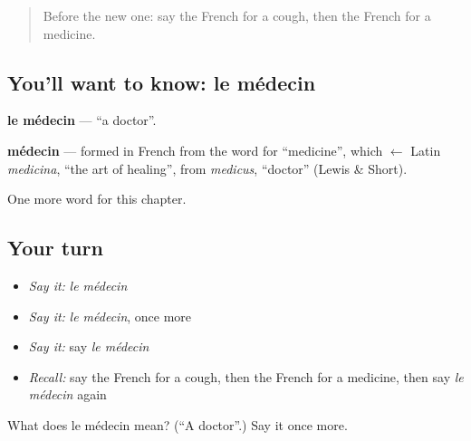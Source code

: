 \begin{quote}
Before the new one: say the French for a cough, then the French for a medicine.
\end{quote}

\subsection*{You'll want to know: le médecin}
\textbf{le médecin} — \textquotedblleft{}a doctor\textquotedblright{}.

\begin{cousinweb}
\textbf{médecin} — formed in French from the word for \textquotedblleft{}medicine\textquotedblright{}, which $\leftarrow$ Latin \emph{medicina}, \textquotedblleft{}the art of healing\textquotedblright{}, from \emph{medicus}, \textquotedblleft{}doctor\textquotedblright{} (Lewis \& Short).
\end{cousinweb}

\begin{grammarlens}[title={What you've built}]
One more word for this chapter.
\end{grammarlens}

\subsection*{Your turn}
\begin{itemize}
\raggedright
  \item \emph{Say it:} \emph{le médecin}
  \item \emph{Say it:} \emph{le médecin}, once more
  \item \emph{Say it:} say \emph{le médecin}
  \item \emph{Recall:} say the French for a cough, then the French for a medicine, then say \emph{le médecin} again
\end{itemize}

\begin{tcolorbox}[breakable,colback=teal!4,colframe=teal!35!black,title={Before you move on}]
What does le médecin mean? (\textquotedblleft{}A doctor\textquotedblright{}.) Say it once more.
\end{tcolorbox}
